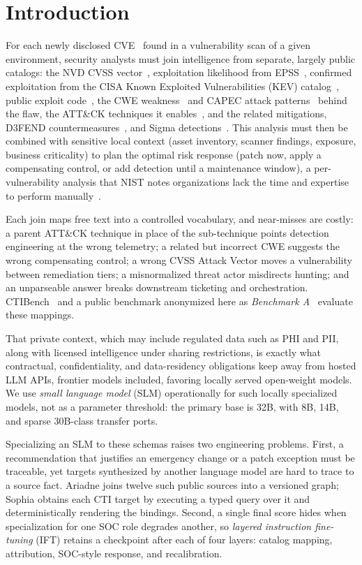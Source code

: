 \documentclass[conference]{IEEEtran}
\begin{document}
\section{Introduction}
For each newly disclosed CVE~\cite{cve} found in a vulnerability scan of a given environment, security analysts must join intelligence from separate, largely public catalogs: the NVD CVSS vector~\cite{nvd}, exploitation likelihood from EPSS~\cite{jacobs2021epss}, confirmed exploitation from the CISA Known Exploited Vulnerabilities (KEV) catalog~\cite{cisakev}, public exploit code~\cite{exploitdb,pocingithub}, the CWE weakness~\cite{cwe} and CAPEC attack patterns~\cite{capec} behind the flaw, the ATT\&CK techniques it enables~\cite{strom2018attack}, and the related mitigations, D3FEND countermeasures~\cite{d3fend}, and Sigma detections~\cite{sigma}. This analysis must then be combined with sensitive local context (asset inventory, scanner findings, exposure, business criticality) to plan the optimal risk response (patch now, apply a compensating control, or add detection until a maintenance window), a per-vulnerability analysis that NIST notes organizations lack the time and expertise to perform manually~\cite{nist80040r4}.

Each join maps free text into a controlled vocabulary, and near-misses are costly: a parent ATT\&CK technique in place of the sub-technique points detection engineering at the wrong telemetry; a related but incorrect CWE suggests the wrong compensating control; a wrong CVSS Attack Vector moves a vulnerability between remediation tiers; a misnormalized threat actor misdirects hunting; and an unparseable answer breaks downstream ticketing and orchestration. CTIBench~\cite{ctibench} and a public benchmark anonymized here as \emph{Benchmark A}~\cite{anonbench} evaluate these mappings.

That private context, which may include regulated data such as PHI and PII, along with licensed intelligence under sharing restrictions, is exactly what contractual, confidentiality, and data-residency obligations keep away from hosted LLM APIs, frontier models included, favoring locally served open-weight models. We use \emph{small language model} (SLM) operationally for such locally specialized models, not as a parameter threshold: the primary base is 32B, with 8B, 14B, and sparse 30B-class transfer ports.

Specializing an SLM to these schemas raises two engineering problems. First, a recommendation that justifies an emergency change or a patch exception must be traceable, yet targets synthesized by another language model are hard to trace to a source fact. Ariadne joins twelve such public sources into a versioned graph; Sophia obtains each CTI target by executing a typed query over it and deterministically rendering the bindings. Second, a single final score hides when specialization for one SOC role degrades another, so \emph{layered instruction fine-tuning} (IFT) retains a checkpoint after each of four layers: catalog mapping, attribution, SOC-style response, and recalibration.
\end{document}
